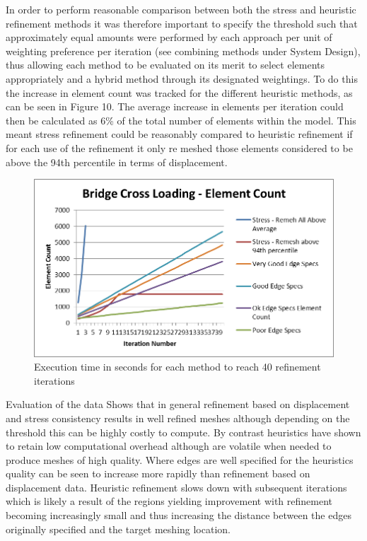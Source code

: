\noindent
In order to perform reasonable comparison between both the stress and heuristic refinement methods it was therefore important to specify the threshold such that approximately equal amounts were performed by each approach per unit of weighting preference per iteration (see combining methods under System Design), thus allowing each method to be evaluated on its merit to select elements appropriately and a hybrid method through its designated weightings. To do this the increase in element count was tracked for the different heuristic methods, as can be seen in Figure 10. The average increase in elements per iteration could then be calculated as 6\% of the total number of elements within the model. This meant stress refinement could be reasonably compared to heuristic refinement if for each use of the refinement it only re meshed those elements considered to be above the 94th percentile in terms of displacement. \\ 


\begin{figure}[!h]
  \centerline{\includegraphics[width=125mm, scale=1]{../Graphics/Graphs/BridgeCrossLoadingElementCount.png}}
  \caption{Execution time in seconds for each method to reach 40 refinement iterations}
  \label{fig:sub1}
\end{figure}

Evaluation of the data Shows that in general refinement based on displacement and stress consistency results in well refined meshes although depending on the threshold this can be highly costly to compute. By contrast heuristics have shown to retain low computational overhead although are volatile when needed to produce meshes of high quality. Where edges are well specified for the heuristics quality can be seen to increase more rapidly than refinement based on displacement data. Heuristic refinement slows down with subsequent iterations which is likely a result of the regions yielding improvement with refinement becoming increasingly small and thus increasing the distance between the edges originally specified and the target meshing location.


